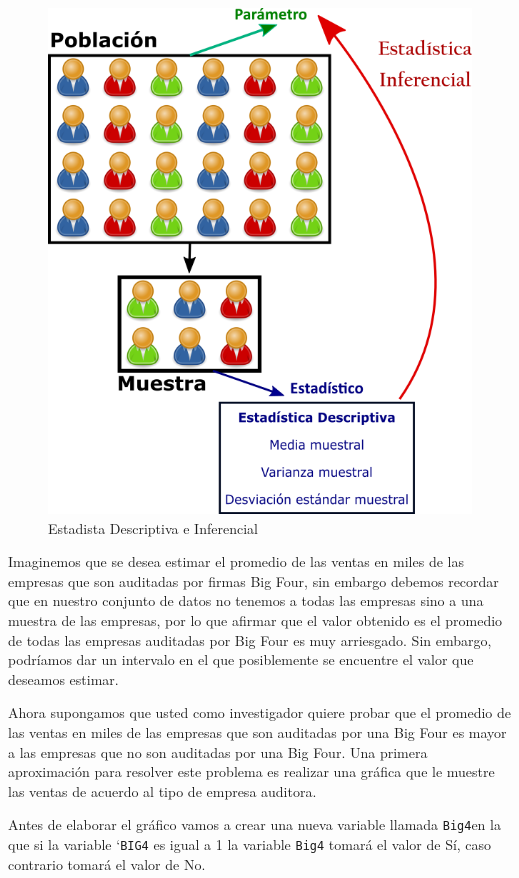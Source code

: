 \documentclass[letterpaper,]{book}
\newenvironment{Shaded}{\begin{snugshade}}{\end{snugshade}}
\newcommand{\DataTypeTok}[1]{\textcolor[rgb]{0.13,0.29,0.53}{#1}}
\newcommand{\DecValTok}[1]{\textcolor[rgb]{0.00,0.00,0.81}{#1}}
\newcommand{\KeywordTok}[1]{\textcolor[rgb]{0.13,0.29,0.53}{\textbf{#1}}}
\newcommand{\NormalTok}[1]{#1}
\newcommand{\OperatorTok}[1]{\textcolor[rgb]{0.81,0.36,0.00}{\textbf{#1}}}
\newcommand{\StringTok}[1]{\textcolor[rgb]{0.31,0.60,0.02}{#1}}
\begin{document}
\begin{figure}[h!]

{\centering \includegraphics[width=0.55\linewidth]{infedesc} 

}

\caption{Estadista Descriptiva e Inferencial}\label{fig:infedesc}
\end{figure}

Imaginemos que se desea estimar el promedio de las ventas en miles de las empresas que son auditadas por firmas Big Four, sin embargo debemos recordar que en nuestro conjunto de datos no tenemos a todas las empresas sino a una muestra de las empresas, por lo que afirmar que el valor obtenido es el promedio de todas las empresas auditadas por Big Four es muy arriesgado. Sin embargo, podríamos dar un intervalo en el que posiblemente se encuentre el valor que deseamos estimar.

Ahora supongamos que usted como investigador quiere probar que el promedio de las ventas en miles de las empresas que son auditadas por una Big Four es mayor a las empresas que no son auditadas por una Big Four. Una primera aproximación para resolver este problema es realizar una gráfica que le muestre las ventas de acuerdo al tipo de empresa auditora.

Antes de elaborar el gráfico vamos a crear una nueva variable llamada \texttt{Big4}en la que si la variable `\texttt{BIG4} es igual a 1 la variable \texttt{Big4} tomará el valor de Sí, caso contrario tomará el valor de No.~

\begin{Shaded}
\end{Shaded}
\end{document}

